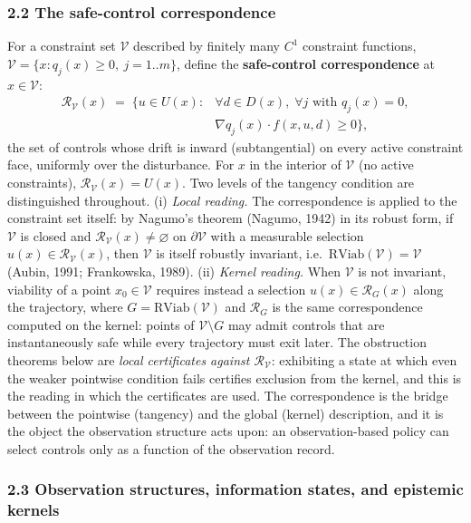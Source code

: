 \documentclass[10pt,twocolumn]{article}
\theoremstyle{definition}
\begin{document}
\subsubsection{2.2 The safe-control
correspondence}\label{the-safe-control-correspondence}

For a constraint set \(\mathcal{V}\) described by finitely many \(C^1\)
constraint functions,
\(\mathcal{V} = \{ x : q_j(x) \ge 0,\ j = 1..m \}\), define the
\textbf{safe-control correspondence} at \(x \in \mathcal{V}\):
\[
\begin{aligned}
\mathcal{R}_{\mathcal{V}}(x) \;=\; \bigl\{ u \in U(x) : {}& \forall d \in D(x),\; \forall j \text{ with } q_j(x) = 0,\\
& \nabla q_j(x) \cdot f(x, u, d) \ge 0 \bigr\},
\end{aligned}
\]
the set of controls whose drift is inward (subtangential) on every
active constraint face, uniformly over the disturbance. For \(x\) in the
interior of \(\mathcal{V}\) (no active constraints),
\(\mathcal{R}_{\mathcal{V}}(x) = U(x)\). Two levels of the tangency condition are distinguished throughout. (i) \emph{Local reading.} The correspondence is applied to the constraint set itself: by Nagumo's theorem (Nagumo, 1942) in its robust form, if \(\mathcal{V}\) is closed and
\(\mathcal{R}_{\mathcal{V}}(x) \neq \varnothing\) on
\(\partial\mathcal{V}\) with a measurable selection
\(u(x) \in \mathcal{R}_{\mathcal{V}}(x)\), then \(\mathcal{V}\) is
itself robustly invariant,
i.e.~\(\mathrm{RViab}(\mathcal{V}) = \mathcal{V}\) (Aubin, 1991;
Frankowska, 1989). (ii) \emph{Kernel reading.} When \(\mathcal{V}\) is not invariant, viability of a point \(x_0 \in \mathcal{V}\) requires instead a selection \(u(x) \in \mathcal{R}_G(x)\) along the trajectory, where \(G = \mathrm{RViab}(\mathcal{V})\) and \(\mathcal{R}_G\) is the same correspondence computed on the kernel: points of
\(\mathcal{V} \setminus G\) may admit controls that are instantaneously
safe while every trajectory must exit later. The obstruction
theorems below are \emph{local certificates against
\(\mathcal{R}_{\mathcal{V}}\)}: exhibiting a state at which even the
weaker pointwise condition fails certifies exclusion from the kernel,
and this is the reading in which the certificates are used. The
correspondence is the bridge between the pointwise (tangency) and the
global (kernel) description, and it is the object the observation
structure acts upon: an observation-based policy can select controls
only as a function of the observation record.

\subsubsection{2.3 Observation structures, information states, and
epistemic
kernels}\label{observation-structures-information-states-and-epistemic-kernels}
\end{document}

